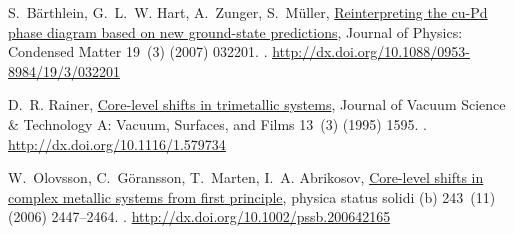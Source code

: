 \documentclass[number, sort&compress, review, 12pt]{elsarticle}
\begin{document}
\begin{thebibliography}{10}
S.~B{\"a}rthlein, G.~L.~W. Hart, A.~Zunger, S.~M{\"u}ller,
  \href{http://dx.doi.org/10.1088/0953-8984/19/3/032201}{Reinterpreting the
  cu-{P}d phase diagram based on new ground-state predictions}, Journal of
  Physics: Condensed Matter 19~(3) (2007) 032201.
\newblock \href {http://dx.doi.org/10.1088/0953-8984/19/3/032201}
  {}.
\newline\urlprefix\url{http://dx.doi.org/10.1088/0953-8984/19/3/032201}

D.~R. Rainer, \href{http://dx.doi.org/10.1116/1.579734}{Core-level shifts in
  trimetallic systems}, Journal of Vacuum Science \& Technology A: Vacuum,
  Surfaces, and Films 13~(3) (1995) 1595.
\newblock \href {http://dx.doi.org/10.1116/1.579734}
  {}.
\newline\urlprefix\url{http://dx.doi.org/10.1116/1.579734}

W.~Olovsson, C.~G\"{o}ransson, T.~Marten, I.~A. Abrikosov,
  \href{http://dx.doi.org/10.1002/pssb.200642165}{Core-level shifts in complex
  metallic systems from first principle}, physica status solidi (b) 243~(11)
  (2006) 2447--2464.
\newblock \href {http://dx.doi.org/10.1002/pssb.200642165}
  {}.
\newline\urlprefix\url{http://dx.doi.org/10.1002/pssb.200642165}

\end{thebibliography}

\end{document}
